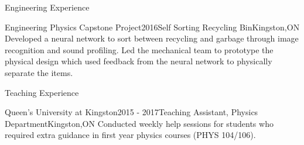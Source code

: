 \documentclass{resume2} %
\begin{document}
\begin{rSection}{Engineering Experience}
	
	\begin{rSubsection}{Engineering Physics Capstone Project}{2016}{Self Sorting Recycling Bin}{Kingston,ON}
		 Developed a neural network to sort between recycling and garbage through image recognition and sound profiling.
		 Led the mechanical team to prototype the physical design which used feedback from the neural network to 
		 physically separate the items. 
	\end{rSubsection}
\iffalse
	\begin{rSubsection}{Engineering Physics Design Project}{2015}{Photodiode Research Sensor}{}
		 Designed and fabricated a research sensor used to assess the properties of photodiodes. Information gathered included efficiency, current and voltage under illuminated and darkened conditions using an Arduino, Matlab and LabVIEW
	\end{rSubsection}

	\begin{rSubsection}{Engineering Design and Practice II}{2014}{Nuclear Waste Gamma Radiation Detector}{Kingston,ON}
		 Prototyped a Nuclear Waste Gamma Radiation Detector. Through the process of material selection and decision making, the final product was designed for use in areas surrounding the Deep Geologic Repository in Ontario
	\end{rSubsection}

	\begin{rSubsection}{Wirecard AG}{Summer 2014}{Summer Technology Intern}{Singapore}
	 Redesigned Wirecard's payment processing webpage using HTML and CSS
	 It is currently used for redirecting online payments to Wirecard's payment processing service	
	\end{rSubsection}
\fi
\end{rSection}


\begin{rSection}{Teaching Experience}
	
	\begin{rSubsection}{Queen's University at Kingston}{2015 - 2017}{Teaching Assistant, Physics Department}{Kingston,ON}
		 Conducted weekly help sessions for students who required extra guidance in first year physics courses (PHYS 104/106).
	\end{rSubsection}

\end{rSection}
\end{document}

